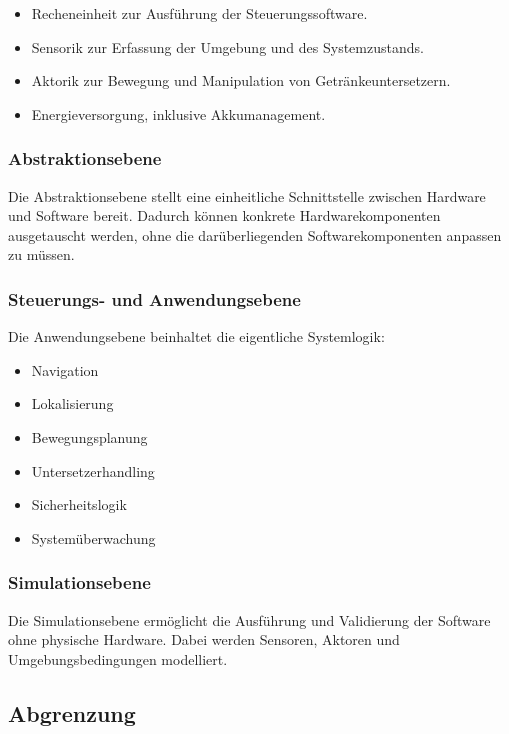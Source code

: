 \begin{itemize}
\tightlist
\item
  Recheneinheit zur Ausführung der Steuerungssoftware.
\item
  Sensorik zur Erfassung der Umgebung und des Systemzustands.
\item
  Aktorik zur Bewegung und Manipulation von Getränkeuntersetzern.
\item
  Energieversorgung, inklusive Akkumanagement.
\end{itemize}

\subsubsection{Abstraktionsebene}\label{abstraktionsebene}

Die Abstraktionsebene stellt eine einheitliche Schnittstelle zwischen
Hardware und Software bereit. Dadurch können konkrete
Hardwarekomponenten ausgetauscht werden, ohne die darüberliegenden
Softwarekomponenten anpassen zu müssen.

\subsubsection{Steuerungs- und
Anwendungsebene}\label{steuerungs--und-anwendungsebene}

Die Anwendungsebene beinhaltet die eigentliche Systemlogik:

\begin{itemize}
\tightlist
\item
  Navigation
\item
  Lokalisierung
\item
  Bewegungsplanung
\item
  Untersetzerhandling
\item
  Sicherheitslogik
\item
  Systemüberwachung
\end{itemize}

\subsubsection{Simulationsebene}\label{simulationsebene}

Die Simulationsebene ermöglicht die Ausführung und Validierung der
Software ohne physische Hardware. Dabei werden Sensoren, Aktoren und
Umgebungsbedingungen modelliert.

\subsection{Abgrenzung}\label{abgrenzung}

